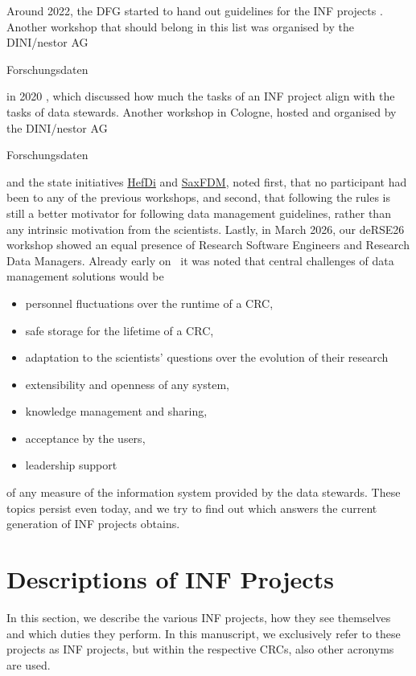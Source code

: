\documentclass{eceasst}
\newenvironment{de}{\begin{otherlanguage}{ngerman}}{\end{otherlanguage}}
\begin{document}
Around 2022, the DFG started to hand out guidelines for the INF projects \cite{bastian_2025}.
Another workshop that should belong in this list was organised by the DINI/nestor AG \begin{de}Forschungsdaten\end{de} in 2020 \cite{Rizzolli_2021},
which discussed how much the tasks of an INF project align with the tasks of data stewards.
Another workshop in Cologne, hosted \cite{bastian_2025} and organised by the DINI/nestor AG \begin{de}Forschungsdaten\end{de} and the state initiatives
 \href{https://www.uni-marburg.de/en/hefdi/about-hefdi}{HefDi} and \href{https://saxfdm.de/}{SaxFDM},
 noted first, that no participant had been to any of the previous workshops, and second, that following the rules is still a better motivator for following data
 management guidelines, rather than any intrinsic motivation from the scientists.
Lastly, in March 2026, our deRSE26 workshop showed an equal presence of Research Software Engineers and Research Data Managers.
Already early on~\cite{mueckschel2006} it was noted that central challenges of data management solutions would be
\begin{itemize}
\itemsep-0.5em
 \item personnel fluctuations over the runtime of a CRC,
 \item safe storage for the lifetime of a CRC,
 \item adaptation to the scientists' questions over the evolution of their research
 \item extensibility and openness of any system,
 \item knowledge management and sharing,
 \item acceptance by the users,
 \item leadership support
\end{itemize}
of any measure of the information system provided by the data stewards.
These topics persist even today,
and we try to find out which answers the current generation of INF projects obtains.

\section{Descriptions of INF Projects}
\label{sec:inf-in-germany}
In this section, we describe the various INF projects, how they see themselves and which duties they perform.
In this manuscript, we exclusively refer to these projects as INF projects, but within the respective CRCs, also other acronyms are used.
\end{document}
